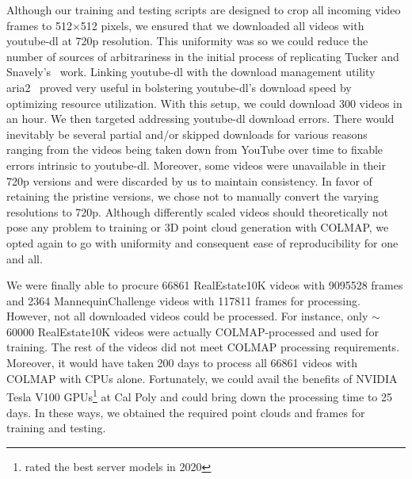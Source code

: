 Although our training and testing scripts are designed to crop all incoming video frames to 512$\times$512 pixels, we ensured that we downloaded all videos with youtube-dl at 720p resolution. This uniformity was so we could reduce the number of sources of arbitrariness in the initial process of replicating Tucker and Snavely's~\cite{single_view_mpi} work. Linking youtube-dl with the download management utility aria2~\cite{noauthor_aria2_2021} proved very useful in bolstering youtube-dl’s download speed by optimizing resource utilization. With this setup, we could download 300 videos in an hour. We then targeted addressing youtube-dl download errors. There would inevitably be several partial and/or skipped downloads for various reasons ranging from the videos being taken down from YouTube over time to fixable errors intrinsic to youtube-dl. Moreover, some videos were unavailable in their 720p versions and were discarded by us to maintain consistency. In favor of retaining the pristine versions, we chose not to manually convert the varying resolutions to 720p. Although differently scaled videos should theoretically not pose any problem to training or 3D point cloud generation with COLMAP, we opted again to go with uniformity and consequent ease of reproducibility for one and all.
    
We were finally able to procure 66861 RealEstate10K videos with 9095528 frames and 2364 MannequinChallenge videos with 117811 frames for processing. However, not all downloaded videos could be processed. For instance, only $\sim$60000 RealEstate10K videos were actually COLMAP-processed and used for training. The rest of the videos did not meet COLMAP processing requirements. Moreover, it would have taken 200 days to process all 66861 videos with COLMAP with CPUs alone. Fortunately, we could avail the benefits of NVIDIA Tesla V100 GPUs\footnote{rated the best server models in 2020} at Cal Poly and could bring down the processing time to 25 days. In these ways, we obtained the required point clouds and frames for training and testing.















